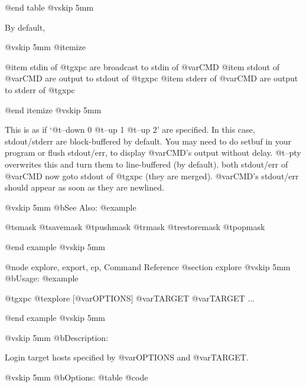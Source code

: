 @end table
@vskip 5mm

By default,

@vskip 5mm
@itemize

@item  stdin of @t{gxpc} are broadcast to stdin of @var{CMD}
@item  stdout of @var{CMD} are output to stdout of @t{gxpc}
@item  stderr of @var{CMD} are output to stderr of @t{gxpc}

@end itemize
@vskip 5mm

This is as if `@t{--down} 0 @t{--up} 1 @t{--up} 2' are specified.  In this
case, stdout/stderr are block-buffered by default.  You may need
to do setbuf in your program or flush stdout/err, to display
@var{CMD}'s output without delay.  @t{--pty} overwrites this and turn them
to line-buffered (by default).  both stdout/err of @var{CMD} now goto
stdout of @t{gxpc} (they are merged).  @var{CMD}'s stdout/err should appear
as soon as they are newlined.

@vskip 5mm
@b{See Also:}
@example

  @t{smask} @t{savemask} @t{pushmask} @t{rmask} @t{restoremask} @t{popmask}

@end example
@vskip 5mm

@node explore, export, ep, Command Reference
@section explore
@vskip 5mm
@b{Usage:}
@example

  @t{gxpc} @t{explore} [@var{OPTIONS}] @var{TARGET} @var{TARGET} ...

@end example
@vskip 5mm

@vskip 5mm
@b{Description:}


  Login target hosts specified by @var{OPTIONS} and @var{TARGET}.

@vskip 5mm
@b{Options:}
@table @code

